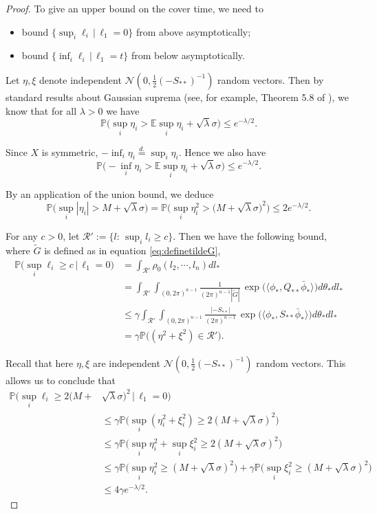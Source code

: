 \documentclass[a4paper, 11pt]{article}
\renewcommand{\P}{\mathbb{P}}
\newcommand{\E}{\mathbb{E}}
\begin{document}
\begin{proof}
To give an upper bound on the cover time, we need to
\begin{itemize}
    \item bound $\{\sup_i\ell_i\,|\,\ell_1=0\}$ from above asymptotically;
    \item bound $\{\inf_i\ell_i\,|\,\ell_1=t\}$ from below asymptotically.
\end{itemize}

Let $\eta, \xi$ denote independent $\mathcal{N}(0,\frac{1}{2}(-S_{**})^{-1})$ random vectors. Then by standard results about Gaussian suprema (see, for example, Theorem 5.8 of \cite{blm13}), we know that for all $\lambda > 0$ we have
\[\P\Big(\sup_i \eta_i>\E\sup_i\eta_i+\sqrt{\lambda}\sigma\Big)\leq e^{-\lambda/2}.\]

Since $X$ is symmetric, $-\inf_i \eta_i\stackrel{d.}{=}\sup_i \eta_i$. Hence we also have
\[\P\Big(-\inf_i \eta_i>\E\sup_i\eta_i+\sqrt{\lambda}\sigma\Big)\leq e^{-\lambda/2}.\]

By an application of the union bound, we deduce
\[\P\Big(\sup_i |\eta_i|>M+\sqrt{\lambda}\sigma\Big)=\P\Big(\sup_i \eta_i^2>\big(M+\sqrt{\lambda}\sigma\big)^2\Big)\leq 2e^{-\lambda/2}.\]

For any $c>0$, let $\mathcal{R}':=\{l:\, \sup_i l_i\geq c\}$. Then we have the following bound, where $\tilde{G}$ is defined as in equation \eqref{eq:definetildeG},
\begin{equation*}
\begin{aligned}
\P\bigg(\sup_i\ell_i \geq c\,\Big|\,\ell_1=0\Big) & = \int_{\mathcal{R}'} \rho_0(l_2,\cdots,l_n)dl_*\\
& = \int_{\mathcal{R}'} \int_{(0,2\pi)^{n-1}}\frac{1}{(2\pi)^{n-1}|\tilde{G}|}\,
\exp\big(\langle \phi_*, Q_{**}\bar{\phi}_*\rangle\big)d\theta_* dl_*\\
& \leq \gamma \int_{\mathcal{R}'} \int_{(0,2\pi)^{n-1}}\frac{|-S_{**}|}{(2\pi)^{n-1}}\,
\exp\big(\langle \phi_*, S_{**}\bar{\phi}_*\rangle\big)d\theta_* dl_*\\
& = \gamma\P\big((\eta^2+\xi^2)\in \mathcal{R}'\big).
\end{aligned}
\end{equation*}

Recall that here $\eta, \xi$ are independent $\mathcal{N}(0,\frac{1}{2}(-S_{**})^{-1})$ random vectors. This allows us to conclude that
\begin{equation*}
\begin{aligned}
\P\Big(\sup_i\ell_i\geq 2(M+& \sqrt{\lambda}\sigma)^2\,\Big|\,\ell_1=0\Big)\\
&\leq \gamma\P\Big(\sup_i(\eta_i^2+\xi_i^2)\geq 2(M+\sqrt{\lambda}\sigma)^2\Big)\\
&\leq \gamma\P\Big(\sup_i\eta_i^2+\sup_i\xi_i^2\geq 2(M+\sqrt{\lambda}\sigma)^2\Big)\\
&\leq \gamma\P\Big(\sup_i\eta_i^2\geq (M+\sqrt{\lambda}\sigma)^2\Big)+\gamma\P\Big(\sup_i\xi_i^2\geq (M+\sqrt{\lambda}\sigma)^2\Big)\\
&\leq 4\gamma e^{-\lambda/2}.
\end{aligned}
\end{equation*}


\end{proof}
\end{document}
